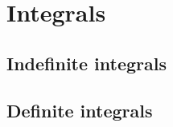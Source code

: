 \chapter{Integrals}
\label{IntegralChapter}


%
%


\section{Indefinite integrals}


\section{Definite integrals}